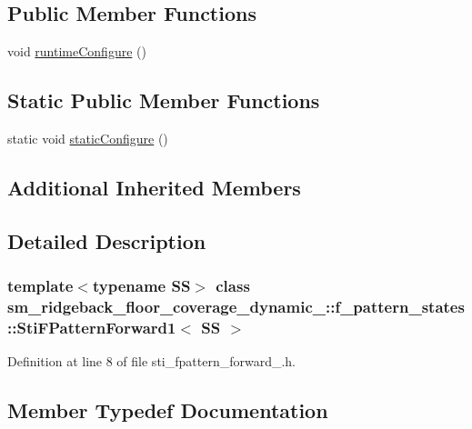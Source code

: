 \subsection*{Public Member Functions}
\begin{DoxyCompactItemize}
\item 
void \hyperlink{structsm__ridgeback__floor__coverage__dynamic__1_1_1f__pattern__states_1_1StiFPatternForward1_a94dfc62e04312989736f978186f8d3db}{runtime\+Configure} ()
\end{DoxyCompactItemize}
\subsection*{Static Public Member Functions}
\begin{DoxyCompactItemize}
\item 
static void \hyperlink{structsm__ridgeback__floor__coverage__dynamic__1_1_1f__pattern__states_1_1StiFPatternForward1_a3b1480a7cc963217105c9f6478a07940}{static\+Configure} ()
\end{DoxyCompactItemize}
\subsection*{Additional Inherited Members}


\subsection{Detailed Description}
\subsubsection*{template$<$typename SS$>$\newline
class sm\+\_\+ridgeback\+\_\+floor\+\_\+coverage\+\_\+dynamic\+\_\+::f\+\_\+pattern\+\_\+states\+::\+Sti\+F\+Pattern\+Forward1$<$ S\+S $>$}



Definition at line 8 of file sti\+\_\+fpattern\+\_\+forward\+\_.\+h.



\subsection{Member Typedef Documentation}
\mbox{\label{structsm__ridgeback__floor__coverage__dynamic__1_1_1f__pattern__states_1_1StiFPatternForward1_a6c1b9c5967a72ecd7dd8cc57d1f8566a}} 
